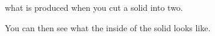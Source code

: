 what is produced when you cut a solid into two.  
\par
You can then see what the inside of the solid looks like.